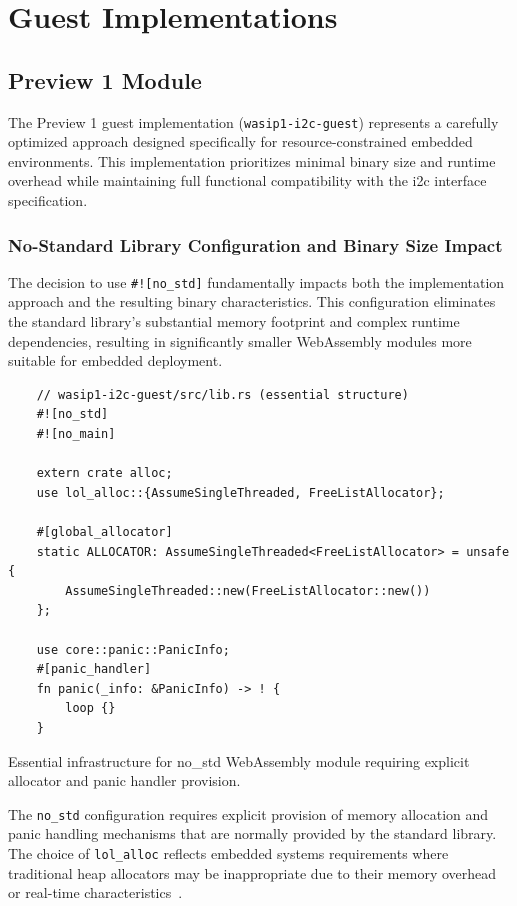 \section{Guest Implementations}
\label{sec:guest-implementations}

\subsection{Preview 1 Module}

The Preview 1 guest implementation (\texttt{wasip1-i2c-guest}) represents a carefully optimized approach designed specifically for resource-constrained embedded environments. This implementation prioritizes minimal binary size and runtime overhead while maintaining full functional compatibility with the \acrshort{i2c} interface specification.

\subsubsection{No-Standard Library Configuration and Binary Size Impact}

The decision to use \texttt{\#![no\_std]} fundamentally impacts both the implementation approach and the resulting binary characteristics. This configuration eliminates the standard library's substantial memory footprint and complex runtime dependencies, resulting in significantly smaller WebAssembly modules more suitable for embedded deployment.

\begin{listing}[H]
    \begin{verbatim}
    // wasip1-i2c-guest/src/lib.rs (essential structure)
    #![no_std]
    #![no_main]
        
    extern crate alloc;
    use lol_alloc::{AssumeSingleThreaded, FreeListAllocator};
    
    #[global_allocator]
    static ALLOCATOR: AssumeSingleThreaded<FreeListAllocator> = unsafe {
        AssumeSingleThreaded::new(FreeListAllocator::new())
    };
    
    use core::panic::PanicInfo;
    #[panic_handler]
    fn panic(_info: &PanicInfo) -> ! {
        loop {}
    }
    \end{verbatim}
    \caption{Essential infrastructure for no\_std WebAssembly module requiring explicit allocator and panic handler provision.}
    \label{lst:no-std-infrastructure}
\end{listing}

The \texttt{no\_std} configuration requires explicit provision of memory allocation and panic handling mechanisms that are normally provided by the standard library. The choice of \texttt{lol\_alloc} reflects embedded systems requirements where traditional heap allocators may be inappropriate due to their memory overhead or real-time characteristics~\cite{lol_alloc_git}.

